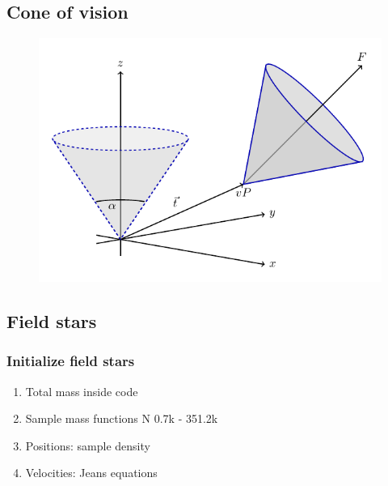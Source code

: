 \documentclass{beamer}
\begin{document}
\subsection{Cone of vision}

\begin{frame}
\begin{figure}
\centering
\includegraphics[width=0.9\linewidth]{Images/cone.pdf}
\end{figure}
\end{frame}

\subsection{Field stars}

\begin{frame}
\frametitle{Initialize field stars}
\begin{enumerate}
\item Total mass inside code
\item Sample mass functions N 0.7k - 351.2k
\item Positions: sample density
\item Velocities: Jeans equations
\end{enumerate}




\end{frame}
\end{document}
